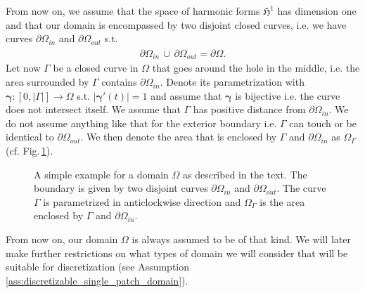 \documentclass[../master_thesis.tex]{subfiles}
\begin{document}
From now on, we assume that the space of harmonic forms $\mathfrak{H}^1$ has dimension 
one and that our domain is encompassed by two disjoint closed curves,
i.e. we have curves $\partial \Omega_{in}$ and $\partial \Omega_{out}$ s.t. 
\begin{align*}
    \partial \Omega_{in} \,\dot\cup \,\partial\Omega_{out} = \partial\Omega. 
\end{align*}
Let now $\Gamma$ be a closed curve in $\Omega$ that goes around the 
hole in the middle, i.e. the area surrounded by $\Gamma$ contains $\partial \Omega_{in}$.
Denote its parametrization with $\bm{\gamma}:[0,|\Gamma|] \rightarrow \Omega$ s.t. 
$|\bm{\gamma}'(t)| = 1$ and assume that $\bm{\gamma}$ is bijective i.e. the curve does not 
intersect itself. We assume that $\Gamma$ has positive distance from 
$\partial \Omega_{in}$. We do not assume anything like that for the exterior boundary 
i.e. $\Gamma$ can touch or be identical to $\partial \Omega_{out}$. 
We then denote the area that is enclosed by $\Gamma$ and
$\partial\Omega_{in}$ as $\Omega_\Gamma$ (cf. Fig.\,\ref{fig:annulus_domain}). 
\begin{figure}
    \centering
    \caption{A simple example for a domain $\Omega$ as described in the text. The boundary 
    is given by two 
    disjoint curves $\partial \Omega_{in}$ and $\partial \Omega_{out}$. The curve 
    $\Gamma$ is parametrized in anticlockwise direction and $\Omega_\Gamma$ is the 
    area enclosed by $\Gamma$ and $\partial \Omega_{in}$.} \label{fig:annulus_domain}
\end{figure}

From now on, our domain $\Omega$ is always assumed to be of that kind. We will 
later make further restrictions on what types of domain we will consider that 
will be suitable for discretization (see Assumption\,\ref{ass:discretizable_single_patch_domain}).
\end{document}

